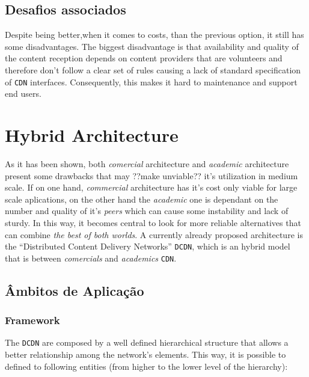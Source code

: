 \documentclass{article}
\begin{document}
\subsection{Desafios associados}
Despite being better,when it comes to costs,
than the previous option, it still has some disadvantages.
The biggest disadvantage is that availability and quality of the content
reception depends on content providers that are volunteers and therefore don't
follow a clear set of rules causing a lack of standard specification of
\texttt{CDN} interfaces.
Consequently, this makes it hard to maintenance and support end users.

\newpage



\section{Hybrid Architecture}


As it has been shown, both \emph{comercial} architecture and 
\emph{academic} architecture present some drawbacks that may 
??make unviable?? it's utilization in medium scale. If on one hand,
\emph{commercial} architecture has it's cost only viable for 
large scale aplications, on the other hand the \emph{academic}
one is dependant on the number and quality of it's \emph{peers}
which can cause some instability and lack of sturdy.
In this way, it becomes central to look for more reliable alternatives
that can combine \emph{the best of both worlds}. A currently already
proposed architecture is the ``Distributed Content Delivery Networks''
\texttt{DCDN}, which is an hybrid model that is between 
\emph{comercials} and \emph{academics} \texttt{CDN}.




\subsection{Âmbitos de Aplicação}

\subsubsection{Framework}
The \texttt{DCDN} are composed by a well defined hierarchical structure
that allows a better relationship among the network's elements.
This way, it is possible to defined to following entities (from higher
to the lower level of the hierarchy):

\end{document}

